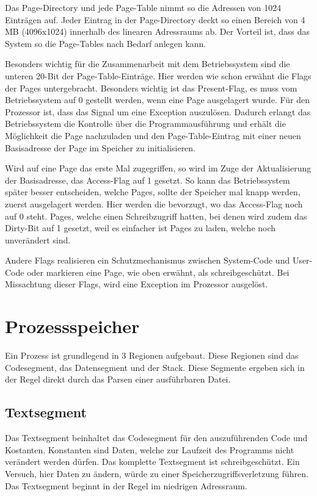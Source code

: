 \documentclass[12pt]{book}
\begin{document}
Das Page-Directory und jede Page-Table nimmt so die Adressen von 1024 Einträgen
auf. Jeder Eintrag in der Page-Directory deckt so einen Bereich von 4 MB
(4096x1024) innerhalb des linearen Adressraums ab. Der Vorteil ist, dass das
System so die Page-Tables nach Bedarf anlegen kann.

Besonders wichtig für die Zusammenarbeit mit dem Betriebssystem sind die
unteren 20-Bit der Page-Table-Einträge. Hier werden wie schon erwähnt die Flags
der Pages untergebracht. Besonders wichtig ist das Present-Flag, es muss vom
Betriebssystem auf 0 gestellt werden, wenn eine Page ausgelagert wurde. Für den
Prozessor ist, dass das Signal um eine Exception auszulösen. Dadurch erlangt
das Betriebssystem die Kontrolle über die Programmausführung und erhält die
Möglichkeit die Page nachzuladen und den Page-Table-Eintrag mit einer neuen
Basisadresse der Page im Speicher zu initialisieren.

Wird auf eine Page das erste Mal zugegriffen, so wird im Zuge der
Aktualisierung der Basisadresse, das Access-Flag auf 1 gesetzt.  So kann das
Betriebssystem später besser entscheiden, welche Pages, sollte der Speicher mal
knapp werden, zuerst ausgelagert werden. Hier werden die bevorzugt, wo das
Access-Flag noch auf 0 steht. Pages, welche einen Schreibzugriff hatten, bei
denen wird zudem das Dirty-Bit auf 1 gesetzt, weil es einfacher ist Pages zu
laden, welche noch unverändert sind.

Andere Flags realisieren ein Schutzmechanismus zwischen System-Code und
User-Code oder markieren eine Page, wie oben erwähnt, als schreibgeschützt. Bei
Missachtung dieser Flags, wird eine Exception im Prozessor ausgelöst.

\section{Prozessspeicher}

Ein Prozess ist grundlegend in 3 Regionen aufgebaut. Diese Regionen sind das
Codesegment, das Datensegment und der Stack. Diese Segmente ergeben sich in der
Regel direkt durch das Parsen einer ausführbaren Datei.

\subsection{Textsegment}

Das Textsegment beinhaltet das Codesegment für den auszuführenden Code und
Kostanten. Konstanten sind Daten, welche zur Laufzeit des Programms nicht
verändert werden dürfen. Das komplette Textsegment ist schreibgeschützt. Ein
Versuch, hier Daten zu ändern, würde zu einer Speicherzugriffsverletzung führen.
Das Textsegment beginnt in der Regel im niedrigen Adressraum.
\end{document}
